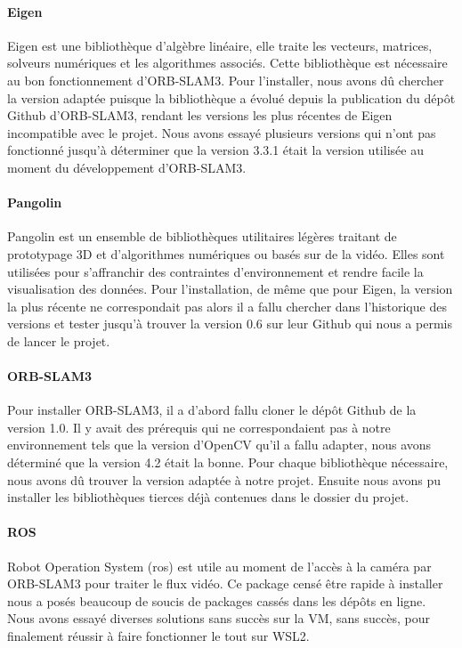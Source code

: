 \documentclass[11pt]{article}
\begin{document}
        \paragraph{Eigen}
          Eigen est une bibliothèque d'algèbre linéaire, elle traite les vecteurs, matrices, solveurs numériques et les algorithmes
          associés. Cette bibliothèque est nécessaire au bon fonctionnement d'ORB-SLAM3. Pour l'installer, nous avons dû chercher la version 
          adaptée puisque la bibliothèque a évolué depuis la publication du dépôt Github d'ORB-SLAM3, rendant les versions les plus récentes
          de Eigen incompatible avec le projet. Nous avons essayé plusieurs versions qui n'ont pas fonctionné jusqu'à déterminer que la version 
          3.3.1 était la version utilisée au moment du développement d'ORB-SLAM3.

        \paragraph{Pangolin}
          Pangolin est un ensemble de bibliothèques utilitaires légères traitant de prototypage 3D et d'algorithmes numériques 
          ou basés sur de la vidéo. Elles sont utilisées pour s'affranchir des contraintes d'environnement et rendre facile la visualisation des 
          données. Pour l'installation, de même que pour Eigen, la version la plus récente ne correspondait pas alors il a fallu chercher dans 
          l'historique des versions et tester jusqu'à trouver la version 0.6 sur leur Github qui nous a permis de lancer le projet.

        \paragraph{ORB-SLAM3}
          Pour installer ORB-SLAM3, il a d'abord fallu cloner le dépôt Github de la version 1.0. 
          Il y avait des prérequis qui ne correspondaient pas à notre environnement tels que la version d'OpenCV qu'il a fallu adapter,
          nous avons déterminé que la version 4.2 était la bonne. Pour chaque bibliothèque nécessaire, nous avons dû trouver la version
          adaptée à notre projet. Ensuite nous avons pu installer les bibliothèques tierces déjà contenues dans le dossier du projet.        

        \paragraph{ROS}
          Robot Operation System (\acrshort{ros}) est utile au moment de l'accès à la caméra par ORB-SLAM3 pour traiter le flux vidéo.
          Ce package censé être rapide à installer nous a posés beaucoup de soucis de packages cassés dans les dépôts en ligne. Nous avons 
          essayé diverses solutions sans succès sur la VM, sans succès, pour finalement réussir à faire fonctionner le tout sur WSL2. 
\end{document}
